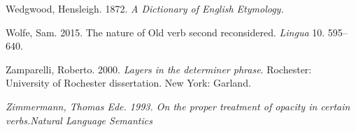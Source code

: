 \begin{styleStandard}
Wedgwood, Hensleigh. 1872. \emph{\textmd{\textit{A Dictionary of English Etymology}}\textmd{. }} 
\end{styleStandard}

\begin{styleannotationtext}
Wolfe, Sam. 2015. The nature of Old  verb second reconsidered. \textit{Lingua} 10. 595–640.
\end{styleannotationtext}

\begin{styleStandard}
Zamparelli, Roberto. 2000. \textit{Layers in the determiner phrase}. Rochester: University of Rochester dissertation. New York: Garland.
\end{styleStandard}

\begin{styleStandard}
\emph{\textmd{Zimmermann, Thomas Ede. 1993. On the proper treatment of opacity in certain verbs.}}\textstyleacopre{\textit{ }}\emph{\textmd{\textit{Natural Language Semantics}}}
\end{styleStandard}

